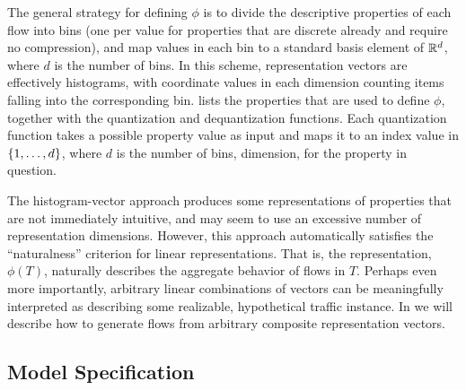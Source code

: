 \documentclass[twocolumn,final]{svjour3}
\begin{document}
The general strategy for defining $\phi$ is to divide the descriptive properties of each flow into bins
(one per value for properties that are discrete already and require no compression),
and map values in each bin to a standard basis element of $\mathbb{R}^d$, where $d$ is the number of bins.
In this scheme, representation vectors are effectively histograms, with coordinate values in each dimension counting items falling into the corresponding bin.
 lists the properties that are used to define $\phi$, together with the quantization and dequantization functions.
Each quantization function takes a possible property value as input and maps it to an index value in ${\left\{1,\dots,d\right\}}$, where $d$ is the number of bins,  dimension, for the property in question.

The histogram-vector approach produces some representations of properties that are not immediately intuitive, and may seem to use an excessive number of representation dimensions.
However, this approach automatically satisfies the ``naturalness'' criterion for linear representations.
That is, the representation, $\phi(T)$, naturally describes the aggregate behavior of flows in $T$.
Perhaps even more importantly, arbitrary linear combinations of vectors can be meaningfully interpreted as describing some realizable, hypothetical traffic instance.
In  we will describe how to generate flows from arbitrary composite representation vectors.

\subsection{Model Specification}
\end{document}
